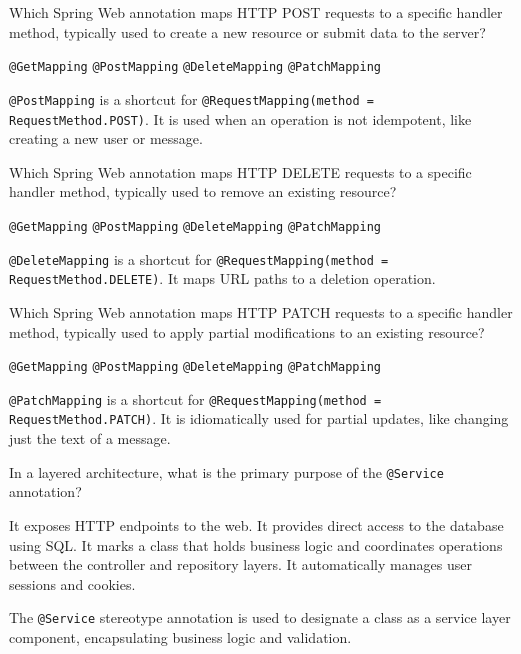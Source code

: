 \question[4]
Which Spring Web annotation maps HTTP POST requests to a specific handler method, typically used to create a new resource or submit data to the server?
\begin{choices}
  \choice \texttt{@GetMapping}
  \CorrectChoice \texttt{@PostMapping}
  \choice \texttt{@DeleteMapping}
  \choice \texttt{@PatchMapping}
\end{choices}
\begin{solution}
  \texttt{@PostMapping} is a shortcut for \texttt{@RequestMapping(method = RequestMethod.POST)}. It is used when an operation is not idempotent, like creating a new user or message.
\end{solution}

\question[4]
Which Spring Web annotation maps HTTP DELETE requests to a specific handler method, typically used to remove an existing resource?
\begin{choices}
  \choice \texttt{@GetMapping}
  \choice \texttt{@PostMapping}
  \CorrectChoice \texttt{@DeleteMapping}
  \choice \texttt{@PatchMapping}
\end{choices}
\begin{solution}
  \texttt{@DeleteMapping} is a shortcut for \texttt{@RequestMapping(method = RequestMethod.DELETE)}. It maps URL paths to a deletion operation.
\end{solution}

\question[4]
Which Spring Web annotation maps HTTP PATCH requests to a specific handler method, typically used to apply partial modifications to an existing resource?
\begin{choices}
  \choice \texttt{@GetMapping}
  \choice \texttt{@PostMapping}
  \choice \texttt{@DeleteMapping}
  \CorrectChoice \texttt{@PatchMapping}
\end{choices}
\begin{solution}
  \texttt{@PatchMapping} is a shortcut for \texttt{@RequestMapping(method = RequestMethod.PATCH)}. It is idiomatically used for partial updates, like changing just the text of a message.
\end{solution}


\question[4]
In a layered architecture, what is the primary purpose of the \texttt{@Service} annotation?
\begin{choices}
  \choice It exposes HTTP endpoints to the web.
  \choice It provides direct access to the database using SQL.
  \CorrectChoice It marks a class that holds business logic and coordinates operations between the controller and repository layers.
  \choice It automatically manages user sessions and cookies.
\end{choices}
\begin{solution}
  The \texttt{@Service} stereotype annotation is used to designate a class as a service layer component, encapsulating business logic and validation.
\end{solution}

